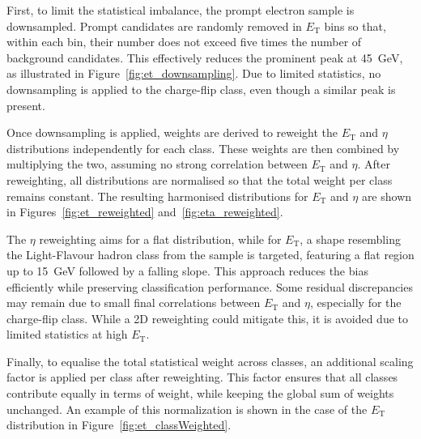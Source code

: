 First, to limit the statistical imbalance, the prompt electron sample is downsampled. Prompt candidates are randomly removed in $E_{\text{T}}$ bins so that, within each bin, their number does not exceed five times the number of background candidates. This effectively reduces the prominent peak at 45~GeV, as illustrated in Figure~\ref{fig:et_downsampling}. Due to limited statistics, no downsampling is applied to the charge-flip class, even though a similar peak is present.

Once downsampling is applied, weights are derived to reweight the $E_{\text{T}}$ and $\eta$ distributions independently for each class. These weights are then combined by multiplying the two, assuming no strong correlation between $E_{\text{T}}$ and $\eta$. After reweighting, all distributions are normalised so that the total weight per class remains constant. The resulting harmonised distributions for $E_{\text{T}}$ and $\eta$ are shown in Figures~\ref{fig:et_reweighted} and~\ref{fig:eta_reweighted}.

The $\eta$ reweighting aims for a flat distribution, while for $E_{\text{T}}$, a shape resembling the Light-Flavour hadron class from the \ttbar sample is targeted, featuring a flat region up to 15~GeV followed by a falling slope. This approach reduces the bias efficiently while preserving classification performance. Some residual discrepancies may remain due to small final correlations between $E_{\text{T}}$ and $\eta$, especially for the charge-flip class. While a 2D reweighting could mitigate this, it is avoided due to limited statistics at high $E_{\text{T}}$.

Finally, to equalise the total statistical weight across classes, an additional scaling factor is applied per class after reweighting. This factor ensures that all classes contribute equally in terms of weight, while keeping the global sum of weights unchanged. An example of this normalization is shown in the case of the $E_{\text{T}}$ distribution in Figure~\ref{fig:et_classWeighted}.

